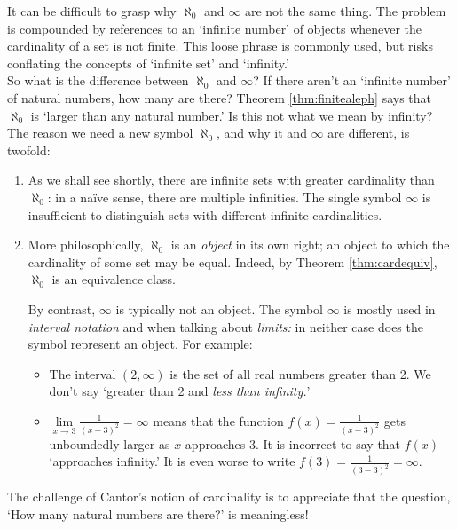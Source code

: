 \begin{aside}

It can be difficult to grasp why $\aleph_0$ and $\infty$ are not the same thing. The problem is compounded by references to an `infinite number' of objects whenever the cardinality of a set is not finite. This loose phrase is commonly used, but risks conflating the concepts of `infinite set' and `infinity.'\\
So what is the difference between $\aleph_0$ and $\infty$? If there aren't an `infinite number' of natural numbers, how many are there? Theorem \ref{thm:finitealeph} says that $\aleph_0$ is `larger than any natural number.' Is this not what we mean by infinity? The reason we need a new symbol $\aleph_0$, and why it and $\infty$ are different, is twofold:
\begin{enumerate}
\item As we shall see shortly, there are infinite sets with greater cardinality than $\aleph_0$: in a naïve sense, there are multiple infinities. The single symbol $\infty$ is insufficient to distinguish sets with different infinite cardinalities.
\item More philosophically, $\aleph_0$ is an \emph{object} in its own right; an object to which the cardinality of some set may be equal. Indeed, by Theorem \ref{thm:cardequiv}, $\aleph_0$ is an equivalence class.

By contrast, $\infty$ is typically not an object. The symbol $\infty$ is mostly used in \emph{interval notation} and when talking about \emph{limits:} in neither case does the symbol represent an object. For example:
\begin{itemize}
  \item The interval $(2,\infty)$ is the set of all real numbers greater than 2. We don't say `greater than 2 and \emph{less than infinity.}'
  \item $\lim\limits_{x\to 3}\frac 1{(x-3)^2}=\infty$ means that the function $f(x)=\frac 1{(x-3)^2}$ gets unboundedly larger as $x$ approaches 3. It is incorrect to say that $f(x)$ `approaches infinity.' It is even worse to write $f(3)=\frac 1{(3-3)^2}=\infty$.
\end{itemize}
\end{enumerate}

\noindent The challenge of Cantor's notion of cardinality is to appreciate that the question, `How many natural numbers are there?' is meaningless!
\end{aside}

